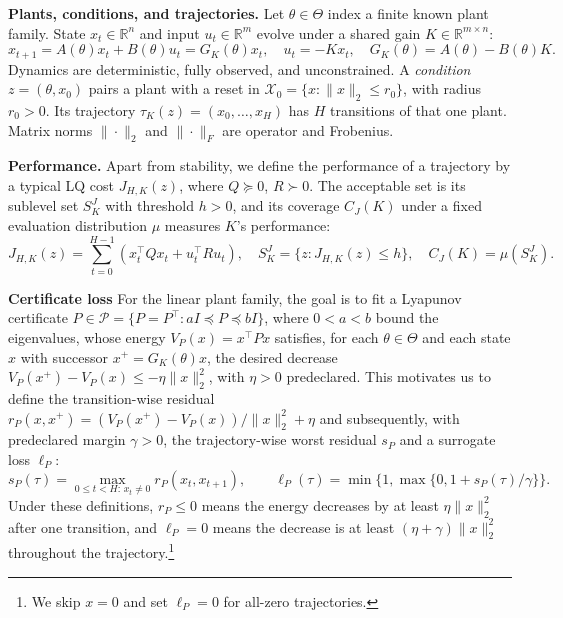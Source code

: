 \documentclass{l4dc2026}
\newcommand{\Pclass}{\mathcal P}
\newcommand{\G}{G_K}
\begin{document}
\textbf{Plants, conditions, and trajectories.}
Let $\theta\in\Theta$ index a finite known plant family. State $x_t\in\mathbb R^n$
and input $u_t\in\mathbb R^m$ evolve under a shared gain $K\in\mathbb R^{m\times n}$:
\begin{equation}\label{eq:mid_dynamics}
 x_{t+1}=A(\theta)x_t+B(\theta)u_t=\G(\theta)x_t,
 \quad u_t=-Kx_t,\quad \G(\theta)=A(\theta)-B(\theta)K.
\end{equation}
Dynamics are deterministic, fully observed, and unconstrained. A \emph{condition} $z=(\theta,x_0)$ pairs a plant with a reset in
$\mathcal X_0=\{x:\|x\|_2\le r_0\}$, with radius $r_0>0$. Its trajectory
$\tau_K(z)=(x_0,\ldots,x_H)$ has $H$ transitions of that one plant.
Matrix norms $\|\cdot\|_2$ and $\|\cdot\|_F$ are operator and Frobenius.

\textbf{Performance.}
Apart from stability, we define the performance of a trajectory by a typical LQ
cost $J_{H,K}(z)$, where $Q\succeq0$, $R\succ0$. The acceptable set is its sublevel set
$S_K^J$ with threshold $h>0$, and its coverage $C_J(K)$ under a fixed evaluation
distribution $\mu$ measures $K$'s performance:
\begin{equation}\label{eq:mid_cost}
 J_{H,K}(z)=\sum_{t=0}^{H-1}(x_t^\top Qx_t+u_t^\top Ru_t),\quad
 S_K^J=\{z:J_{H,K}(z)\le h\},\quad C_J(K)=\mu(S_K^J).
\end{equation}

\textbf{Certificate loss}
For the linear plant family, the goal is to fit a Lyapunov certificate
$P\in\Pclass=\{P=P^\top:aI\preceq P\preceq bI\}$, where $0<a<b$ bound the eigenvalues,
whose energy $V_P(x)=x^\top Px$ satisfies, for each $\theta\in\Theta$ and each state $x$
with successor $x^+=\G(\theta)x$, the desired decrease
$V_P(x^+)-V_P(x)\le-\eta\|x\|_2^2$, with $\eta>0$ predeclared. This motivates us to
define the transition-wise residual
$r_P(x,x^+)=(V_P(x^+)-V_P(x))/\|x\|_2^2+\eta$ and subsequently, with predeclared
margin $\gamma>0$, the trajectory-wise worst residual $s_P$ and a surrogate loss $\ell_P$:
\begin{equation}\label{eq:mid_loss}
 s_P(\tau)=\max_{0\le t<H:\,x_t\ne0}r_P(x_t,x_{t+1}),\qquad
 \ell_P(\tau)=\min\{1,\max\{0,1+s_P(\tau)/\gamma\}\}.
\end{equation}
Under these definitions, $r_P\le0$ means the energy decreases by at least
$\eta\|x\|_2^2$ after one transition, and $\ell_P=0$ means the decrease is at least
$(\eta+\gamma)\|x\|_2^2$ throughout the trajectory.\footnote{We skip $x=0$ and set
$\ell_P=0$ for all-zero trajectories.}
\end{document}
